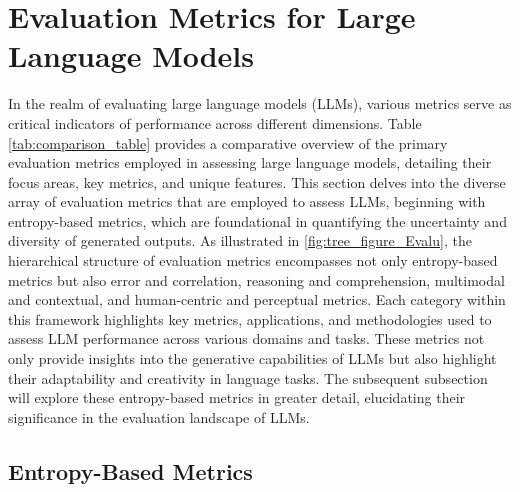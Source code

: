 \section{Evaluation Metrics for Large Language Models} \label{sec:Evaluation Metrics for Large Language Models}

 

In the realm of evaluating large language models (LLMs), various metrics serve as critical indicators of performance across different dimensions. Table \ref{tab:comparison_table} provides a comparative overview of the primary evaluation metrics employed in assessing large language models, detailing their focus areas, key metrics, and unique features. This section delves into the diverse array of evaluation metrics that are employed to assess LLMs, beginning with entropy-based metrics, which are foundational in quantifying the uncertainty and diversity of generated outputs. As illustrated in \autoref{fig:tree_figure_Evalu}, the hierarchical structure of evaluation metrics encompasses not only entropy-based metrics but also error and correlation, reasoning and comprehension, multimodal and contextual, and human-centric and perceptual metrics. Each category within this framework highlights key metrics, applications, and methodologies used to assess LLM performance across various domains and tasks. These metrics not only provide insights into the generative capabilities of LLMs but also highlight their adaptability and creativity in language tasks. The subsequent subsection will explore these entropy-based metrics in greater detail, elucidating their significance in the evaluation landscape of LLMs.










\subsection{Entropy-Based Metrics} \label{subsec:Entropy-Based Metrics}


